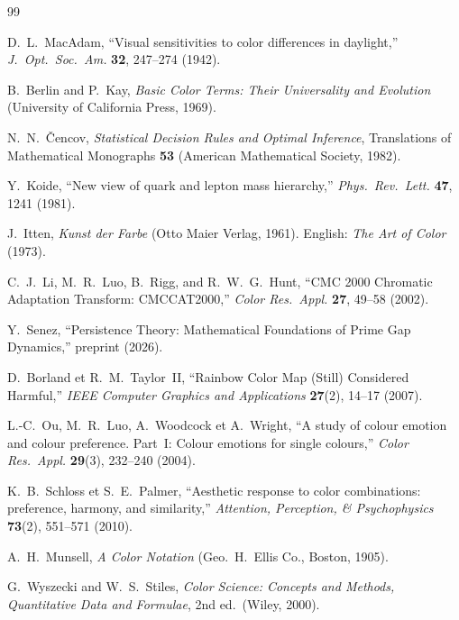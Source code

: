 \documentclass[12pt,a4paper]{article}
\begin{document}
\begin{thebibliography}{99}

D.~L.~MacAdam,
``Visual sensitivities to color differences in daylight,''
\textit{J.~Opt.~Soc.~Am.} \textbf{32}, 247--274 (1942).

B.~Berlin and P.~Kay,
\textit{Basic Color Terms: Their Universality and Evolution}
(University of California Press, 1969).

N.~N.~\v{C}encov,
\textit{Statistical Decision Rules and Optimal Inference},
Translations of Mathematical Monographs \textbf{53}
(American Mathematical Society, 1982).

Y.~Koide,
``New view of quark and lepton mass hierarchy,''
\textit{Phys.~Rev.~Lett.} \textbf{47}, 1241 (1981).

J.~Itten,
\textit{Kunst der Farbe} (Otto Maier Verlag, 1961).
English: \textit{The Art of Color} (1973).

C.~J.~Li, M.~R.~Luo, B.~Rigg, and R.~W.~G.~Hunt,
``CMC 2000 Chromatic Adaptation Transform: CMCCAT2000,''
\textit{Color Res.\ Appl.} \textbf{27}, 49--58 (2002).

Y.~Senez,
``Persistence Theory: Mathematical Foundations of Prime Gap Dynamics,''
preprint (2026).

D.~Borland et R.~M.~Taylor~II,
``Rainbow Color Map (Still) Considered Harmful,''
\textit{IEEE Computer Graphics and Applications} \textbf{27}(2), 14--17 (2007).

L.-C.~Ou, M.~R.~Luo, A.~Woodcock et A.~Wright,
``A study of colour emotion and colour preference. Part~I: Colour
emotions for single colours,''
\textit{Color Res.\ Appl.} \textbf{29}(3), 232--240 (2004).

K.~B.~Schloss et S.~E.~Palmer,
``Aesthetic response to color combinations: preference, harmony, and
similarity,''
\textit{Attention, Perception, \& Psychophysics} \textbf{73}(2),
551--571 (2010).

A.~H.~Munsell,
\textit{A Color Notation} (Geo.~H.~Ellis Co., Boston, 1905).


G.~Wyszecki and W.~S.~Stiles,
\textit{Color Science: Concepts and Methods, Quantitative Data and
Formulae}, 2nd ed.\ (Wiley, 2000).


\end{thebibliography}
\end{document}
